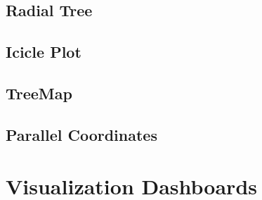 \documentclass[12pt]{article}
\begin{document}
\begin{doublespace}
\subsection{Radial Tree}
\subsection{Icicle Plot}
\subsection{TreeMap}
\subsection{Parallel Coordinates}

\pagebreak
\section{Visualization Dashboards}



\end{doublespace}
\end{document}
